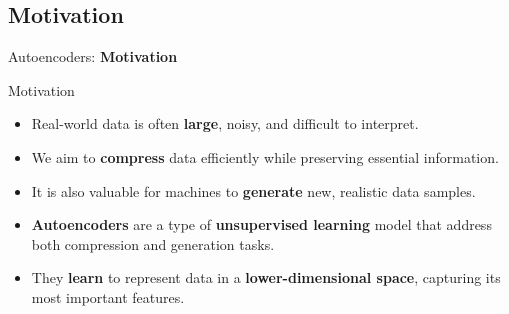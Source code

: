 \subsection{Motivation}
\begin{frame}{}
    \LARGE Autoencoders: \textbf{Motivation}
\end{frame}

\begin{frame}{Motivation}
    \begin{itemize}
        \item Real-world data is often \textbf{large}, noisy, and difficult to interpret.
        \item We aim to \textbf{compress} data efficiently while preserving essential information.
        \item It is also valuable for machines to \textbf{generate} new, realistic data samples.
        \item \textbf{Autoencoders} are a type of \textbf{unsupervised learning} model that address both compression and generation tasks.
        \item They \textbf{learn} to represent data in a \textbf{lower-dimensional space}, capturing its most important features.
    \end{itemize}
\end{frame}